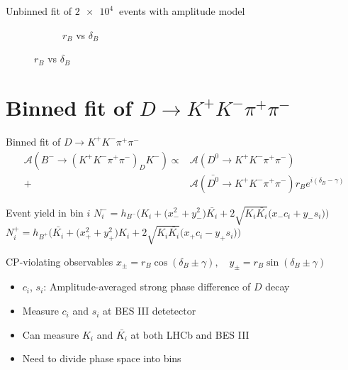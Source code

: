 \documentclass{beamer}
\begin{document}
\begin{frame}{Unbinned fit of $\SI{2e4}{}$ events with amplitude model}
\begin{figure}
\begin{subfigure}{0.46\textwidth}
      \caption{$r_B$ vs $\delta_B$}
    \end{subfigure}
  \end{figure}
\end{frame}

\section{Binned fit of \texorpdfstring{$D\to K^+K^-\pi^+\pi^-$}{D to K+K-pi+pi-}}
\begin{frame}{Binned fit of $D\to K^+K^-\pi^+\pi^-$}
  \vspace{-0.5cm}
  \begin{align*}
    \mathcal{A}(B^-\to(K^+K^-\pi^+\pi^-)_DK^-)\propto& \mathcal{A}(D^0\to K^+K^-\pi^+\pi^-) \\
  +& \mathcal{A}(\bar{D^0}\to K^+K^-\pi^+\pi^-)r_Be^{i(\delta_B - \gamma)}
  \end{align*}
  \vspace{-0.5cm}
  \begin{block}{Event yield in bin $i$}
    $N^-_i = h_{B^-}\Big(K_i + \big(x_-^2 + y_-^2\big)\bar{K_i} + 2\sqrt{K_i\bar{K_i}}\big(x_-c_i + y_-s_i\big)\Big)$
    $N^+_i = h_{B^+}\Big(\bar{K_i} + \big(x_+^2 + y_+^2\big)K_i + 2\sqrt{K_i\bar{K_i}}\big(x_+c_i - y_+s_i\big)\Big)$
  \end{block}
  \begin{block}{CP-violating observables}
    $x_\pm = r_B\cos(\delta_B\pm\gamma), \quad y_\pm = r_B\sin(\delta_B\pm\gamma)$
  \end{block}
  \begin{itemize}
    \item{$c_i$, $s_i$: Amplitude-averaged strong phase difference of $D$ decay}
    \item{Measure $c_i$ and $s_i$ at BES III detetector}
    \item{Can measure $K_i$ and $\bar{K_i}$ at both LHCb and BES III}
    \item{Need to divide phase space into bins}
  \end{itemize}
\end{frame}
\end{document}
